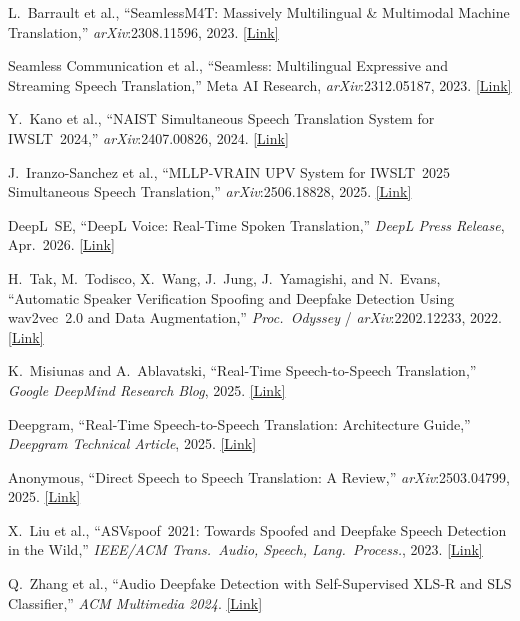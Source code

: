 \documentclass[10pt,twocolumn]{article}
\begin{document}
\noindent
[1] L.~Barrault et al., ``SeamlessM4T: Massively Multilingual \& Multimodal
Machine Translation,'' \textit{arXiv}:2308.11596, 2023.
\href{https://arxiv.org/abs/2308.11596}{[Link]}

\noindent
[2] Seamless Communication et al., ``Seamless: Multilingual Expressive and
Streaming Speech Translation,'' Meta AI Research, \textit{arXiv}:2312.05187, 2023.
\href{https://arxiv.org/abs/2312.05187}{[Link]}

\noindent
[3] Y.~Kano et al., ``NAIST Simultaneous Speech Translation System for IWSLT~2024,''
\textit{arXiv}:2407.00826, 2024.
\href{https://arxiv.org/abs/2407.00826}{[Link]}

\noindent
[4] J.~Iranzo-Sanchez et al., ``MLLP-VRAIN UPV System for IWSLT~2025 Simultaneous
Speech Translation,'' \textit{arXiv}:2506.18828, 2025.
\href{https://arxiv.org/abs/2506.18828}{[Link]}

\noindent
[5] DeepL~SE, ``DeepL Voice: Real-Time Spoken Translation,''
\textit{DeepL Press Release}, Apr.~2026.
\href{https://www.deepl.com/en/press-release/deepl-unveils-real-time-spoken-translation-breaking-the-next-language-barrier-with-voice-to-voice}{[Link]}

\noindent
[6] H.~Tak, M.~Todisco, X.~Wang, J.~Jung, J.~Yamagishi, and N.~Evans,
``Automatic Speaker Verification Spoofing and Deepfake Detection Using wav2vec~2.0
and Data Augmentation,'' \textit{Proc.\ Odyssey} / \textit{arXiv}:2202.12233, 2022.
\href{https://arxiv.org/abs/2202.12233}{[Link]}

\noindent
[7] K.~Misiunas and A.~Ablavatski, ``Real-Time Speech-to-Speech Translation,''
\textit{Google DeepMind Research Blog}, 2025.
\href{https://research.google/blog/real-time-speech-to-speech-translation/}{[Link]}

\noindent
[8] Deepgram, ``Real-Time Speech-to-Speech Translation: Architecture Guide,''
\textit{Deepgram Technical Article}, 2025.
\href{https://deepgram.com/learn/real-time-speech-to-speech-translation}{[Link]}

\noindent
[9] Anonymous, ``Direct Speech to Speech Translation: A Review,''
\textit{arXiv}:2503.04799, 2025.
\href{https://arxiv.org/abs/2503.04799}{[Link]}

\noindent
[10] X.~Liu et al., ``ASVspoof~2021: Towards Spoofed and Deepfake Speech Detection
in the Wild,'' \textit{IEEE/ACM Trans.\ Audio, Speech, Lang.\ Process.}, 2023.
\href{https://arxiv.org/abs/2210.02437}{[Link]}

\noindent
[11] Q.~Zhang et al., ``Audio Deepfake Detection with Self-Supervised XLS-R and
SLS Classifier,'' \textit{ACM Multimedia 2024}.
\href{https://dl.acm.org/doi/10.1145/3664647.3681345}{[Link]}
\end{document}
